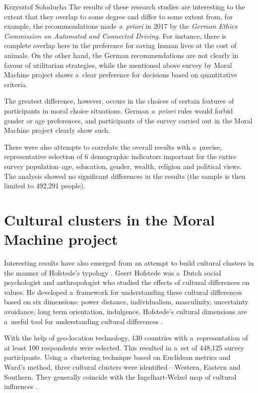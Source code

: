 \begin{artengenv}{Krzysztof Sołoducha}
The results of these research studies are interesting to the extent that they overlap to some degree and differ to some extent from, for example, the recommendations made \textit{a~priori} in 2017 by the \textit{German Ethics Commission on Automated and Connected Driving}. For instance, there is complete overlap here in the preference for saving human lives at the cost of animals. On the other hand, the German recommendations are not clearly in favour of utilitarian strategies, while the mentioned above survey by Moral Machine project shows a~clear preference for decisions based on quantitative criteria.

The greatest difference, however, occurs in the choices of certain features of participants in moral choice situations. German \textit{a~priori} rules would forbid gender or age preferences, and participants of the survey carried out in the Moral Machine project clearly show such.

There were also attempts to correlate the overall results with a~precise, representative selection of 6 demographic indicators important for the entire survey population--age, education, gender, wealth, religion and political views. The analysis showed no significant differences in the results (the sample is then limited to 492,291 people).

\section*{Cultural clusters in the Moral Machine project}
Interesting results have also emerged from an attempt to build cultural clusters in the manner of Hofstede's typology
\parencite[][]{hofstede_cultures_2010}. %
 Geert Hofstede was a~Dutch social psychologist and anthropologist who studied the effects of cultural differences on values. He developed a~framework for understanding these cultural differences based on six dimensions: power distance, individualism, masculinity, uncertainty avoidance, long term orientation, indulgence. Hofstede's cultural dimensions are a~useful tool for understanding cultural differences 
\parencite[][]{hofstede_geert_2011}.%


With the help of geo-location technology, 130 countries with a~representation of at least 100 respondents were selected. This resulted in a~set of 448,125 survey participants. Using a~clustering technique based on Euclidean metrics and Ward's method, three cultural clusters were identified—Western, Eastern and Southern. They generally coincide with the Ingelhart-Welzel map of cultural influences
\parencite[][]{inglehart_modernization_2005}.%



\end{artengenv}
